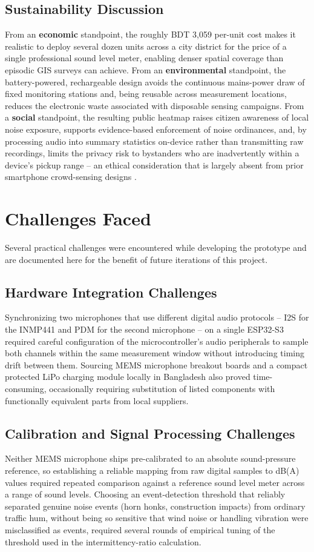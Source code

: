 \documentclass[conference]{IEEEtran}
\begin{document}
\subsection{Sustainability Discussion}
From an \textbf{economic} standpoint, the roughly BDT 3,059 per-unit cost makes it realistic to deploy several dozen units across a city district for the price of a single professional sound level meter, enabling denser spatial coverage than episodic GIS surveys can achieve. From an \textbf{environmental} standpoint, the battery-powered, rechargeable design avoids the continuous mains-power draw of fixed monitoring stations and, being reusable across measurement locations, reduces the electronic waste associated with disposable sensing campaigns. From a \textbf{social} standpoint, the resulting public heatmap raises citizen awareness of local noise exposure, supports evidence-based enforcement of noise ordinances, and, by processing audio into summary statistics on-device rather than transmitting raw recordings, limits the privacy risk to bystanders who are inadvertently within a device's pickup range -- an ethical consideration that is largely absent from prior smartphone crowd-sensing designs \cite{b5}.

\section{Challenges Faced}
Several practical challenges were encountered while developing the prototype and are documented here for the benefit of future iterations of this project.

\subsection{Hardware Integration Challenges}
Synchronizing two microphones that use different digital audio protocols -- I2S for the INMP441 and PDM for the second microphone -- on a single ESP32-S3 required careful configuration of the microcontroller's audio peripherals to sample both channels within the same measurement window without introducing timing drift between them. Sourcing MEMS microphone breakout boards and a compact protected LiPo charging module locally in Bangladesh also proved time-consuming, occasionally requiring substitution of listed components with functionally equivalent parts from local suppliers.

\subsection{Calibration and Signal Processing Challenges}
Neither MEMS microphone ships pre-calibrated to an absolute sound-pressure reference, so establishing a reliable mapping from raw digital samples to dB(A) values required repeated comparison against a reference sound level meter across a range of sound levels. Choosing an event-detection threshold that reliably separated genuine noise events (horn honks, construction impacts) from ordinary traffic hum, without being so sensitive that wind noise or handling vibration were misclassified as events, required several rounds of empirical tuning of the threshold used in the intermittency-ratio calculation.
\end{document}
